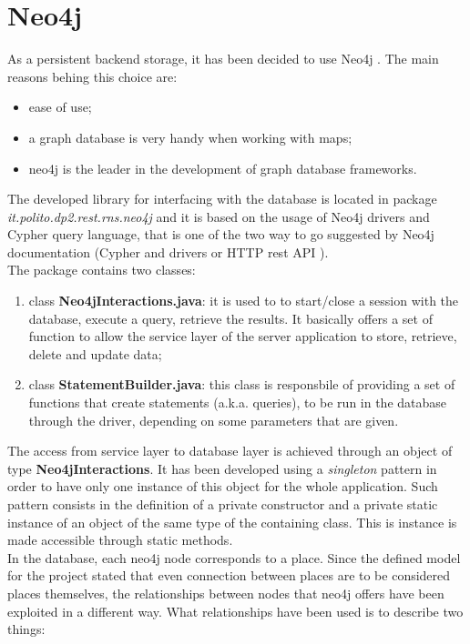 \section{Neo4j} \label{Chap:Neo4j}
As a persistent backend storage, it has been decided to use Neo4j \cite{neo4j}. The main reasons behing this choice are:
\begin{itemize}
  \item ease of use;
  \item a graph database is very handy when working with maps;
  \item neo4j is the leader in the development of graph database frameworks.
\end{itemize}
The developed library for interfacing with the database is located in package \textit{it.polito.dp2.rest.rns.neo4j} and it is based on the usage of Neo4j drivers and Cypher query language, that is one of the two way to go suggested by Neo4j documentation (Cypher and drivers \cite{neo4jcypher} or HTTP rest API \cite{neo4jhttprest}). \\
The package contains two classes:
\begin{enumerate}
  \item class \textbf{Neo4jInteractions.java}: it is used to to start/close a session with the database, execute a query, retrieve the results. It basically offers a set of function to allow the service layer of the server application to store, retrieve, delete and update data;
  \item class \textbf{StatementBuilder.java}: this class is responsbile of providing a set of functions that create statements (a.k.a. queries), to be run in the database through the driver, depending on some parameters that are given.
\end{enumerate}
The access from service layer to database layer is achieved through an object of type \textbf{Neo4jInteractions}. It has been developed using a \textit{singleton} pattern in order to have only one instance of this object for the whole application. Such pattern consists in the definition of a private constructor and a private static instance of an object of the same type of the containing class. This is instance is made accessible through static methods. \\
In the database, each neo4j node corresponds to a place. Since the defined model for the project stated that even connection between places are to be considered places themselves, the relationships between nodes that neo4j offers have been exploited in a different way. What relationships have been used is to describe two things:
